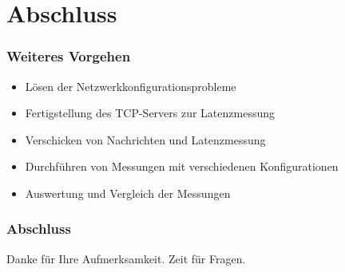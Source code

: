 \documentclass{beamer}
\begin{document}
\section{Abschluss}

    \begin{frame}
        \frametitle{Weiteres Vorgehen}

        \begin{itemize}
            \item Lösen der Netzwerkkonfigurationsprobleme
            \item Fertigstellung des TCP-Servers zur Latenzmessung
            \item Verschicken von Nachrichten und Latenzmessung
            \item Durchführen von Messungen mit verschiedenen Konfigurationen
            \item Auswertung und Vergleich der Messungen
        \end{itemize}
    \end{frame}

    \begin{frame}
        \frametitle{Abschluss}

        Danke für Ihre Aufmerksamkeit.
        \vfill
        Zeit für Fragen.
    \end{frame}


    \bgroup
    \begin{frame}[plain]{}
    \end{frame}
    \egroup
\end{document}
